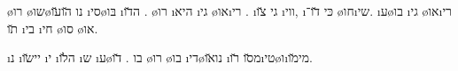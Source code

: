 \o{רו} \o{שו}\o{נו} \u{הו}\u{עו}  \i{סי}\o{בּו} \i{ה}\u{דו}  \dinozaurim. \o{רו}  \i{היא} \i{גי} \o{או}\i{רי} . \i{גי}     \u{צו} \i{ווי},  \i{כּי}  \u{דו}־      \o{חו}\i{שי}. \i{ע}\o{בו} \i{גי} \o{או}\i{רי} \u{תו} \i{בי} \i{חי}  \o{סו} \o{או}.

 \i{נ} \i{יי}\u{שו}  \i{י} \i{ה}\u{לו} \i{ש}  \i{ע}\o{בו} \dinozaurim. \u{דו} \o{רו}  \o{בו}  \i{די}\o{נו}\u{או} \i{מ}\u{סו} \u{רו}\i{טי}\o{ו}\i{מי}\u{מו}.
